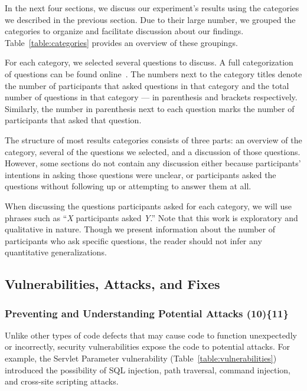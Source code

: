 \documentclass{acm_proc_article-sp}
\begin{document}
In the next four sections, we discuss our experiment's results using the categories we described in the previous section.
Due to their large number, we grouped the categories to organize and facilitate discussion about our findings. 
Table~\ref{table:categories} provides an overview of these groupings.

For each category, we selected several questions to discuss. A full categorization of questions can be found online~\cite{ExperimentalMaterials}.
The numbers next to the category titles denote the number of participants that asked questions in that category and the total number of questions in that category --- in parenthesis and brackets respectively. Similarly, the number in parenthesis next to each question marks the number of participants that asked that question.

The structure of most results categories consists of three parts: an overview of the category, several of the questions we selected, and a discussion of those questions.
However, some sections do not contain any discussion either because participants' intentions in asking those questions were unclear, or participants asked the questions without following up or attempting to answer them at all. 

When discussing the questions participants asked for each category, we will use phrases such as ``\emph{X} participants asked \emph{Y}.''
Note that this work is exploratory and qualitative in nature.
Though we present information about the number of participants who ask specific questions, the reader should not infer any quantitative generalizations.

\subsection{Vulnerabilities, Attacks, and Fixes}
\label{sec:results-vaf}



\subsubsection{\textbf{Preventing and Understanding Potential Attacks (10)\{11\}}}\label{pupa}
Unlike other types of code defects that may cause code to function unexpectedly or incorrectly, security vulnerabilities expose the code to potential attacks. For example, the Servlet Parameter vulnerability (Table~\ref{table:vulnerabilities}) introduced the possibility of SQL injection, path traversal, command injection, and cross-site scripting attacks.
\end{document}
